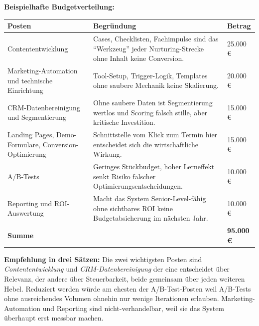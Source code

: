 \documentclass[11pt,a4paper,oneside]{article}
\begin{document}
\begin{loesungbox}
\textbf{Beispielhafte Budgetverteilung:}

\smallskip
\begin{tabularx}{\linewidth}{@{}lXl@{}}
\toprule
\textbf{Posten} & \textbf{Begründung} & \textbf{Betrag} \\
\midrule
Contententwicklung & Cases, Checklisten, Fachimpulse sind das ``Werkzeug'' jeder Nurturing-Strecke \textendash{} ohne Inhalt keine Conversion. & 25.000\,\euro \\
\midrule
Marketing-Automation und technische Einrichtung & Tool-Setup, Trigger-Logik, Templates \textendash{} ohne saubere Mechanik keine Skalierung. & 20.000\,\euro \\
\midrule
CRM-Datenbereinigung und Segmentierung & Ohne saubere Daten ist Segmentierung wertlos und Scoring falsch \textendash{} stille, aber kritische Investition. & 15.000\,\euro \\
\midrule
Landing Pages, Demo-Formulare, Conversion-Optimierung & Schnittstelle vom Klick zum Termin \textendash{} hier entscheidet sich die wirtschaftliche Wirkung. & 15.000\,\euro \\
\midrule
A/B-Tests & Geringes Stückbudget, hoher Lerneffekt \textendash{} senkt Risiko falscher Optimierungsentscheidungen. & 10.000\,\euro \\
\midrule
Reporting und ROI-Auswertung & Macht das System Senior-Level-fähig \textendash{} ohne sichtbares ROI keine Budgetabsicherung im nächsten Jahr. & 10.000\,\euro \\
\midrule
\textbf{Summe} & & \textbf{95.000\,\euro} \\
\bottomrule
\end{tabularx}

\smallskip
\textbf{Empfehlung in drei Sätzen:}
Die zwei wichtigsten Posten sind \emph{Contententwicklung} und \emph{CRM-Datenbereinigung} \textendash{} der eine entscheidet über Relevanz, der andere über Steuerbarkeit, beide gemeinsam über jeden weiteren Hebel. Reduziert werden würde am ehesten der A/B-Test-Posten \textendash{} weil A/B-Tests ohne ausreichendes Volumen ohnehin nur wenige Iterationen erlauben. Marketing-Automation und Reporting sind nicht-verhandelbar, weil sie das System überhaupt erst messbar machen.
\end{loesungbox}

\clearpage

\end{document}
